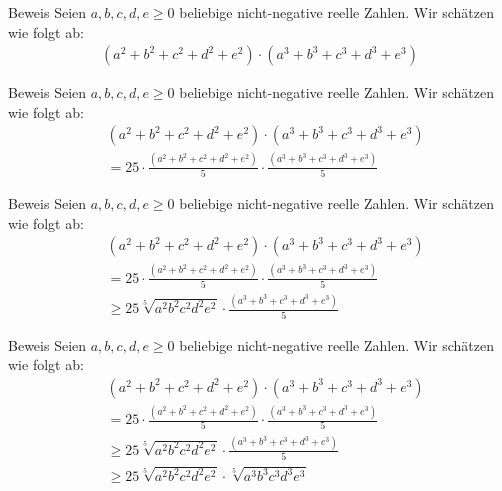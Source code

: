 \documentclass[10pt]{beamer}
\begin{document}
\begin{frame}{Beweis}
    Seien \( a, b, c, d, e \geq 0 \) beliebige nicht-negative reelle Zahlen. Wir schätzen wie folgt ab:
    \begin{align*}
        \left( a^{2} + b^{2} + c^{2} + d^{2} + e^{2} \right) \cdot \left( a^{3} + b^{3} + c^{3} + d^{3} + e^{3} \right)
    \end{align*}
\end{frame}



\begin{frame}{Beweis}
    Seien \( a, b, c, d, e \geq 0 \) beliebige nicht-negative reelle Zahlen. Wir schätzen wie folgt ab:
    \begin{align*}
        & \left( a^{2} + b^{2} + c^{2} + d^{2} + e^{2} \right) \cdot \left( a^{3} + b^{3} + c^{3} + d^{3} + e^{3} \right) \\
        & = 25 \cdot \frac{\left( a^{2} + b^{2} + c^{2} + d^{2} + e^{2} \right)}{5} \cdot \frac{\left( a^{3} + b^{3} + c^{3} + d^{3} + e^{3} \right)}{5}
    \end{align*}
\end{frame}



\begin{frame}{Beweis}
    Seien \( a, b, c, d, e \geq 0 \) beliebige nicht-negative reelle Zahlen. Wir schätzen wie folgt ab:
    \begin{align*}
        & \left( a^{2} + b^{2} + c^{2} + d^{2} + e^{2} \right) \cdot \left( a^{3} + b^{3} + c^{3} + d^{3} + e^{3} \right) \\
        & = 25 \cdot \frac{\left( a^{2} + b^{2} + c^{2} + d^{2} + e^{2} \right)}{5} \cdot \frac{\left( a^{3} + b^{3} + c^{3} + d^{3} + e^{3} \right)}{5} \\
        & \geq 25 \sqrt[5]{a^{2} b^{2} c^{2} d^{2} e^{2}} \cdot \frac{\left( a^{3} + b^{3} + c^{3} + d^{3} + e^{3} \right)}{5}
    \end{align*}
\end{frame}



\begin{frame}{Beweis}
    Seien \( a, b, c, d, e \geq 0 \) beliebige nicht-negative reelle Zahlen. Wir schätzen wie folgt ab:
    \begin{align*}
        & \left( a^{2} + b^{2} + c^{2} + d^{2} + e^{2} \right) \cdot \left( a^{3} + b^{3} + c^{3} + d^{3} + e^{3} \right) \\
        & = 25 \cdot \frac{\left( a^{2} + b^{2} + c^{2} + d^{2} + e^{2} \right)}{5} \cdot \frac{\left( a^{3} + b^{3} + c^{3} + d^{3} + e^{3} \right)}{5} \\
        & \geq 25 \sqrt[5]{a^{2} b^{2} c^{2} d^{2} e^{2}} \cdot \frac{\left( a^{3} + b^{3} + c^{3} + d^{3} + e^{3} \right)}{5} \\
        & \geq 25 \sqrt[5]{a^{2} b^{2} c^{2} d^{2} e^{2}} \cdot \sqrt[5]{a^{3} b^{3} c^{3} d^{3} e^{3}}
    \end{align*}
\end{frame}
\end{document}
